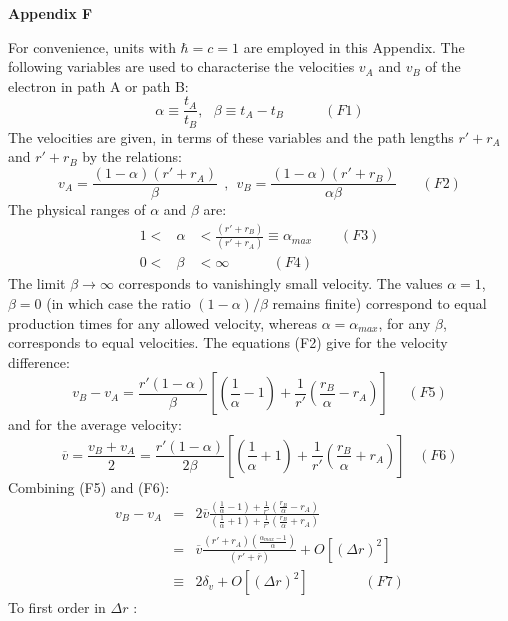 {  \newpage
  {\bf Appendix F}
  \par   For convenience, units with $\hbar = c =1$ are employed in this Appendix.
   The following variables are used to characterise the velocities $v_A$ and $v_B$ of the electron in
   path A or path B:
  \[ \alpha \equiv \frac{ t_A}{ t_B},~~~\beta \equiv  t_A- t_B ~~~~~~~~~~~~~(F1) \]
    The velocities are given, in terms of these variables and the path lengths $r'+r_A$ and $r'+r_B$ by
 the relations:
   \[ v_A =\frac{(1-\alpha)(r'+r_A)}{\beta}~~,~~ v_B =\frac{(1-\alpha)(r'+r_B)}{ \alpha \beta}~~~~~~~~(F2) \]
   The physical ranges of $\alpha$ and $\beta$ are:
    \begin{eqnarray}
     1 <  & \alpha & < \frac{(r'+r_B)}{(r'+r_A)} \equiv \alpha_{max} \nonumber~~~~~~~~~(F3) \\
     0 < & \beta & < \infty  \nonumber~~~~~~~~~~~~~~(F4)
   \end{eqnarray}
   The limit $\beta \rightarrow \infty$ corresponds to vanishingly small velocity.  The values $\alpha = 1$, $\beta = 0$
   (in which case the ratio $(1-\alpha)/\beta$ remains finite) correspond to equal production times for any allowed velocity,
    whereas $\alpha = \alpha_{max}$, for any $\beta$, corresponds to equal velocities. The equations (F2) give
    for the velocity difference:
    \[ v_B -v_A = \frac{r'(1-\alpha)}{\beta}\left[(\frac{1}{\alpha}-1)+ \frac{1}{r'}(\frac{r_B}{\alpha}-r_A)\right]~~~~~~(F5) \]
      and for the average velocity:
     \[ \overline{v} = \frac{v_B +v_A}{2} = 
     \frac{r'(1-\alpha)}{2 \beta}\left[(\frac{1}{\alpha}+1)+ \frac{1}{r'}(\frac{r_B}{\alpha}+r_A)\right]~~~~(F6) \]
     Combining (F5) and (F6):
    \begin{eqnarray}   
     v_B -v_A & = &   2  \overline{v}\frac{(\frac{1}{\alpha}-1)+ \frac{1}{r'}(\frac{r_B}{\alpha}-r_A)}
      {(\frac{1}{\alpha}+1)+ \frac{1}{r'}(\frac{r_B}{\alpha}+r_A)}  \nonumber \\
      & = & \overline{v} \frac{(r'+r_A)(\frac{\alpha_{max}-1}{\alpha})}{(r'+\overline{r})} + O[(\Delta r)^2]
       \nonumber \\
      & \equiv & 2 \delta_v + O[(\Delta r)^2]~~~~~~~~~~~~~~~~~~(F7) \nonumber
    \end{eqnarray}
    To first order in $\Delta r$ :

}
